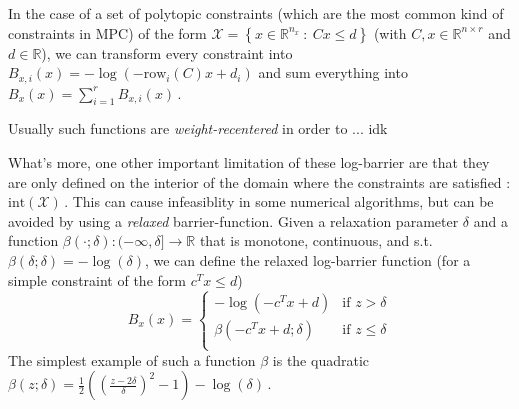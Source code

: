 \documentclass[12pt]{article}
\numberwithin{theorem}{section} %
\theoremstyle{definition}
\theoremstyle{remark}
\def\cal#1{\mathcal{#1}}
\newcommand{\R}{\mathbb{R}}
\begin{document}
In the case of a set of polytopic constraints (which are the most common kind of constraints in MPC) of the form $\cal{X}=\left\{x\in\R^{n_x}~:~Cx\leq d\right\}$ (with $C,x\in\R^{n\times r}$ and $d\in\R$), we can transform every constraint into $B_{x,i}(x)=-\log(-\mathrm{row}_i(C)x+d_i)$ and sum everything into $B_x(x)=\sum_{i=1}^rB_{x,i}(x)$\,.


Usually such functions are \textit{weight-recentered} in order to ... idk %

What's more, one other important limitation of these log-barrier are that they are only defined on the interior of the domain where the constraints are satisfied : $\mathrm{int}(\cal{X})$\,.
This can cause infeasiblity in some numerical algorithms, but can be avoided by using a \textit{relaxed} barrier-function.
Given a relaxation parameter $\delta$ and a function $\beta(\cdot;\delta):(-\infty,\delta]\to\R$ that is monotone, continuous, and s.t. $\beta(\delta;\delta)=-\log(\delta)$, we can define the relaxed log-barrier function (for a simple constraint of the form $c^Tx\leq d$)
$$B_{x}(x)=\begin{cases}
	-\log(-c^Tx+d)&\text{if }z>\delta\\
	\beta(-c^Tx+d;\delta)&\text{if }z\leq\delta\\
\end{cases}$$
The simplest example of such a function $\beta$ is the quadratic $\beta(z;\delta)=\frac{1}{2}\left(\left(\frac{z-2\delta}{\delta}\right)^2-1\right)-\log(\delta)$\,.

\vskip 1cm
\end{document}
